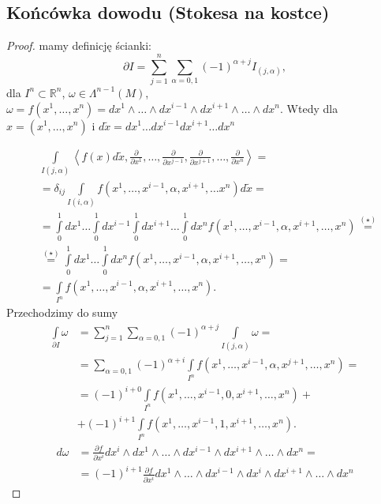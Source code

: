 \documentclass[../main.tex]{subfiles}
\begin{document}
\subsection{Końcówka dowodu (Stokesa na kostce)}
\begin{proof}

mamy definicję ścianki:
\[
    \partial I = \sum_{j = 1}^n\sum_{\alpha = 0,1}(-1)^{\alpha+j}I_{(j,\alpha)}
,\]
dla $I^n\subset\mathbb{R}^n$, $\omega\in \Lambda^{n-1}(M)$, $\omega = f(x^1, \ldots, x^n) = dx^1\land \ldots\land dx^{i-1}\land dx^{i+1}\land \ldots\land dx^n$. Wtedy dla $x = (x^1,\ldots,x^n)$ i $d\tilde x = dx^1\ldots dx^{i-1}dx^{i+1}\ldots dx^n$

\begin{align*}
    &\int\limits_{I(j,\alpha)}\left<f(x) d\tilde x, \frac{\partial }{\partial x^1}, \ldots, \frac{\partial }{\partial x^{j-1}}, \frac{\partial }{\partial x^{j+1}}, \ldots, \frac{\partial }{\partial x^n} \right> = \\
    &= \delta_{ij} \int\limits_{I(i,\alpha)}f(x^1,\ldots,x^{i-1},\alpha, x^{i+1}, \ldots x^n)d\tilde x =\\
    &= \int\limits_0^1 dx^1 \ldots \int\limits_0^1 dx^{i-1} \int\limits_0^1 dx^{i+1} \ldots \int\limits_0^1 dx^n f(x^1,\ldots,x^{i-1},\alpha, x^{i+1}, \ldots, x^n) \overset{(\star)}{=}\\
        &\overset{(\star)}{=} \int\limits_0^1dx^1\ldots\int\limits_0^1dx^n f(x^1,\ldots, x^{i-1},\alpha, x^{i+1}, \ldots, x^n) =\\
        &=\int\limits_{I^n}f(x^1,\ldots,x^{i-1},\alpha, x^{i+1}, \ldots, x^n)
.\end{align*}
Przechodzimy do sumy
\begin{align*}
    \int\limits_{\partial I}\omega &= \sum_{j=1}^{n} \sum_{\alpha = 0,1} (-1)^{\alpha+j}\int\limits_{I(j,\alpha)}\omega =\\
    &= \sum_{\alpha = 0,1}(-1)^{\alpha + i}\int\limits_{I^n}f(x^1,\ldots,x^{i-1},\alpha,x^{j+1},\ldots,x^n) =\\
    &= (-1)^{i+0}\int\limits_{I^n}f(x^1,\ldots,x^{i-1}, 0, x^{i+1},\ldots,x^n) + \\
    &+ (-1)^{i+1}\int\limits_{I^n}f(x^1,\ldots,x^{i-1},1,x^{i+1},\ldots,x^n)
.\end{align*}
\begin{align*}
    d\omega &= \frac{\partial f}{\partial x^i} dx^i\land dx^1\land \ldots\land dx^{i-1}\land dx^{i+1}\land \ldots\land dx^n = \\
    &= (-1)^{i+1} \frac{\partial f}{\partial x^i} dx^1\land \ldots\land dx^{i-1}\land dx^i \land dx^{i+1} \land \ldots \land dx^n

\end{align*}
\end{proof}
\end{document}
